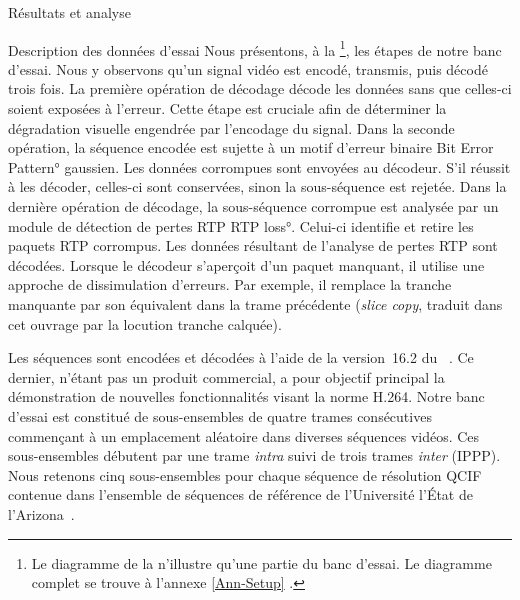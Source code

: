 \begin{chapter}{Résultats et analyse}
\begin{section}{Description des données d'essai}
Nous présentons, à la \footnote{Le diagramme de la
 n'illustre qu'une partie du banc d'essai. Le diagramme
complet se trouve à l'annexe \ref{Ann-Setup} .}, les étapes de
notre banc d'essai. Nous y observons qu'un signal vidéo est encodé, transmis,
puis décodé trois fois. La première opération de décodage décode les données
sans que celles-ci soient exposées à l’erreur. Cette étape est cruciale afin de
déterminer la dégradation visuelle engendrée par l’encodage du signal. Dans la
seconde opération, la séquence encodée est sujette à un motif d’erreur binaire
\ang{Bit Error Pattern} gaussien. Les données corrompues sont envoyées au
décodeur. S’il réussit à les décoder, celles-ci sont conservées, sinon la
sous-séquence est rejetée. Dans la dernière opération de décodage, la
sous-séquence corrompue est analysée par un module de détection de pertes RTP
\ang{RTP loss}. Celui-ci identifie et retire les paquets RTP corrompus. Les
données résultant de l’analyse de pertes RTP sont décodées. Lorsque le décodeur
s'aperçoit d'un paquet manquant, il utilise une approche de dissimulation
d’erreurs. Par exemple, il remplace la tranche manquante par son équivalent dans
la trame précédente (\textit{slice copy},
traduit dans cet ouvrage par la locution tranche calquée).

Les séquences sont encodées et décodées à l'aide de la version~16.2 du
\ltCodec~\citep{JM}. Ce dernier, n'étant pas un produit commercial, a pour
objectif principal la démonstration de nouvelles fonctionnalités visant la norme
H.264. Notre banc d'essai est constitué de sous-ensembles de quatre trames
consécutives commençant à un emplacement aléatoire dans diverses séquences
vidéos. Ces sous-ensembles débutent par une trame \textit{intra} suivi de trois
trames \textit{inter} (IPPP). Nous retenons cinq sous-ensembles pour chaque
séquence de résolution QCIF contenue dans l'ensemble de séquences de référence
de l'Université l'État de l'Arizona~\citep{YUV}.


\end{section}
\end{chapter}
